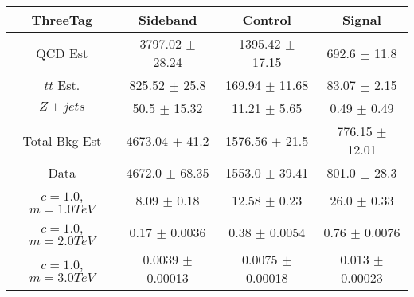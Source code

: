 \begin{footnotesize} 
\begin{tabular}{c|c|c|c} 
ThreeTag & Sideband & Control & Signal \\ 
\hline\hline 
QCD Est & 3797.02 $\pm$ 28.24 & 1395.42 $\pm$ 17.15 & 692.6 $\pm$ 11.8\\ 
$t\bar{t}$ Est.  & 825.52 $\pm$ 25.8 & 169.94 $\pm$ 11.68 & 83.07 $\pm$ 2.15\\ 
$Z+jets$ & 50.5 $\pm$ 15.32 & 11.21 $\pm$ 5.65 & 0.49 $\pm$ 0.49\\ 
Total Bkg Est & 4673.04 $\pm$ 41.2 & 1576.56 $\pm$ 21.5 & 776.15 $\pm$ 12.01\\ 
Data & 4672.0 $\pm$ 68.35 & 1553.0 $\pm$ 39.41 & 801.0 $\pm$ 28.3\\ 
$c=1.0$,$m=1.0TeV$ & 8.09 $\pm$ 0.18 & 12.58 $\pm$ 0.23 & 26.0 $\pm$ 0.33\\ 
$c=1.0$,$m=2.0TeV$ & 0.17 $\pm$ 0.0036 & 0.38 $\pm$ 0.0054 & 0.76 $\pm$ 0.0076\\ 
$c=1.0$,$m=3.0TeV$ & 0.0039 $\pm$ 0.00013 & 0.0075 $\pm$ 0.00018 & 0.013 $\pm$ 0.00023\\ 
\hline\hline 
\end{tabular} 
\end{footnotesize} 
\newline 
